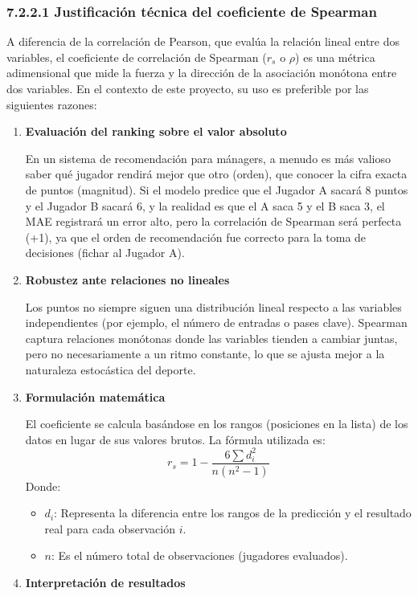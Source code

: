 \subsubsection{7.2.2.1 Justificación técnica del coeficiente de Spearman}
A diferencia de la correlación de Pearson, que evalúa la relación lineal entre
dos variables, el coeficiente de correlación de Spearman ($r_s$ o
$\rho$) es una métrica adimensional que mide la fuerza y la dirección de la
asociación monótona entre dos variables. En el contexto de este proyecto, su uso
es preferible por las siguientes razones:
 
\begin{enumerate}
\item \textbf{Evaluación del ranking sobre el valor absoluto}
 
En un sistema de recomendación para mánagers, a menudo es más valioso saber qué
jugador rendirá mejor que otro (orden), que conocer la cifra exacta de puntos
(magnitud). Si el modelo predice que el Jugador A sacará 8 puntos y el Jugador B
sacará 6, y la realidad es que el A saca 5 y el B saca 3, el MAE registrará un
error alto, pero la correlación de Spearman será perfecta (+1), ya que el orden
de recomendación fue correcto para la toma de decisiones (fichar al Jugador A).
 
\item \textbf{Robustez ante relaciones no lineales}
 
Los puntos no siempre siguen una distribución lineal respecto a
las variables independientes (por ejemplo, el número de entradas o pases clave).
Spearman captura relaciones monótonas donde las variables tienden a cambiar
juntas, pero no necesariamente a un ritmo constante, lo que se ajusta mejor a la
naturaleza estocástica del deporte.
 
\item \textbf{Formulación matemática}
 
El coeficiente se calcula basándose en los rangos (posiciones en la lista) de
los datos en lugar de sus valores brutos. La fórmula utilizada es:
$$r_s = 1 - \frac{6 \sum d_i^2}{n(n^2 - 1)}$$
Donde:
\begin{itemize}
\item $d_i$: Representa la diferencia entre los rangos de la predicción y el
resultado real para cada observación $i$.
\item $n$: Es el número total de observaciones (jugadores evaluados).
\end{itemize}
 
\item \textbf{Interpretación de resultados}
 

\end{enumerate}
